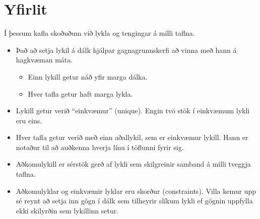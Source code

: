 \section{Yfirlit}
Í þessum kafla skoðuðum við lykla og tengingar á milli taflna.

\begin{itemize}
 \item Það að setja lykil á dálk hjálpar gagnagrunnskerfi að vinna með hann á hagkvæman máta.
 \begin{itemize}
  \item Einn lykill getur náð yfir marga dálka.
  \item Hver tafla getur haft marga lykla.
 \end{itemize}
 \item Lykill getur verið ``einkvæmur'' (unique). Engin tvö stök í einkvæmum lykli eru eins.
 \item Hver tafla getur verið með einn aðallykil, sem er einkvæmur lykill. Hann er notaður til að auðkenna hverja línu í töflunni fyrir sig.
 \item Aðkomulykill er sérstök gerð af lykli sem skilgreinir samband á milli tveggja taflna.
 \item Aðkomulyklar og einkvæmir lyklar eru skorður (constraints). Villa kemur upp sé reynt að setja inn gögn í dálk sem tilheyrir slíkum lykli ef gögnin uppfylla ekki skilyrðin sem lykillinn setur.
\end{itemize}





